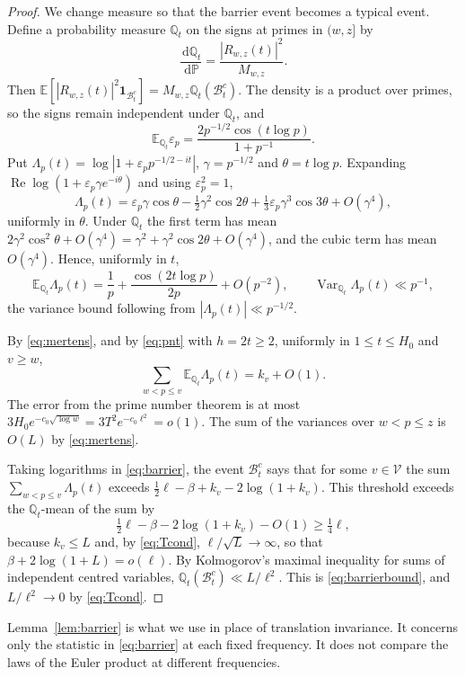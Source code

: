 \documentclass[11pt]{amsart}
\theoremstyle{remark}
\numberwithin{equation}{section}
\newcommand{\E}{\mathbb{E}}
\renewcommand{\P}{\mathbb{P}}
\newcommand{\Q}{\mathbb{Q}}
\newcommand{\one}{\mathbf{1}}
\newcommand{\Var}{\operatorname{Var}}
\newcommand{\dd}{\,\mathrm{d}}
\begin{document}
\begin{proof}
We change measure so that the barrier event becomes a typical event. Define a probability measure $\Q_t$ on the signs at primes in $(w,z]$ by
\[
\frac{\dd\Q_t}{\dd\P}=\frac{|R_{w,z}(t)|^2}{M_{w,z}} .
\]
Then $\E[|R_{w,z}(t)|^2\one_{\mathcal B_t^c}]=M_{w,z}\Q_t(\mathcal B_t^c)$. The density is a product over primes, so the signs remain independent under $\Q_t$, and
\[
\E_{\Q_t}\varepsilon_p=\frac{2p^{-1/2}\cos(t\log p)}{1+p^{-1}} .
\]
Put $\Lambda_p(t)=\log|1+\varepsilon_pp^{-1/2-it}|$, $\gamma=p^{-1/2}$ and $\theta=t\log p$. Expanding $\operatorname{Re}\log(1+\varepsilon_p\gamma e^{-i\theta})$ and using $\varepsilon_p^2=1$,
\[
\Lambda_p(t)=\varepsilon_p\gamma\cos\theta-\tfrac12\gamma^2\cos2\theta+\tfrac13\varepsilon_p\gamma^3\cos3\theta+O(\gamma^4),
\]
uniformly in $\theta$. Under $\Q_t$ the first term has mean $2\gamma^2\cos^2\theta+O(\gamma^4)=\gamma^2+\gamma^2\cos2\theta+O(\gamma^4)$, and the cubic term has mean $O(\gamma^4)$. Hence, uniformly in $t$,
\begin{equation}\label{eq:tiltmean}
\E_{\Q_t}\Lambda_p(t)=\frac1p+\frac{\cos(2t\log p)}{2p}+O(p^{-2}),\qquad\Var_{\Q_t}\Lambda_p(t)\ll p^{-1},
\end{equation}
the variance bound following from $|\Lambda_p(t)|\ll p^{-1/2}$.

By \eqref{eq:mertens}, and by \eqref{eq:pnt} with $h=2t\ge2$, uniformly in $1\le t\le H_0$ and $v\ge w$,
\[
\sum_{w<p\le v}\E_{\Q_t}\Lambda_p(t)=k_v+O(1).
\]
The error from the prime number theorem is at most $3H_0e^{-c_0\sqrt{\log w}}=3T^2e^{-c_0\ell^2}=o(1)$. The sum of the variances over $w<p\le z$ is $O(L)$ by \eqref{eq:mertens}.

Taking logarithms in \eqref{eq:barrier}, the event $\mathcal B_t^c$ says that for some $v\in\mathcal V$ the sum $\sum_{w<p\le v}\Lambda_p(t)$ exceeds $\tfrac12\ell-\beta+k_v-2\log(1+k_v)$. This threshold exceeds the $\Q_t$-mean of the sum by
\[
\tfrac12\ell-\beta-2\log(1+k_v)-O(1)\ge\tfrac14\ell,
\]
because $k_v\le L$ and, by \eqref{eq:Tcond}, $\ell/\sqrt L\to\infty$, so that $\beta+2\log(1+L)=o(\ell)$. By Kolmogorov's maximal inequality for sums of independent centred variables, $\Q_t(\mathcal B_t^c)\ll L/\ell^2$. This is \eqref{eq:barrierbound}, and $L/\ell^2\to0$ by \eqref{eq:Tcond}.
\end{proof}

Lemma~\ref{lem:barrier} is what we use in place of translation invariance. It concerns only the statistic in \eqref{eq:barrier} at each fixed frequency. It does not compare the laws of the Euler product at different frequencies.
\end{document}
